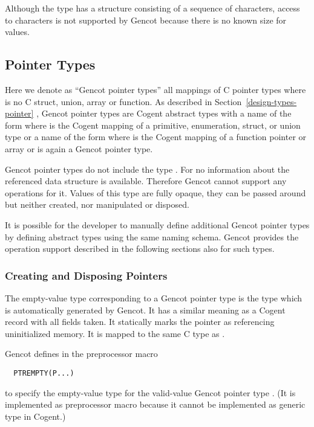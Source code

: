 Although the type  has a structure consisting of a sequence of characters, access to characters is not supported
by Gencot because there is no known size for  values.

\subsection{Pointer Types}
\label{design-operations-pointer}

Here we denote as ``Gencot pointer types'' all mappings of C pointer types  where  is no C struct, union, array or function.
As described in Section~\ref{design-types-pointer} , Gencot pointer types are 
Cogent abstract types with a name of the form  where  is the Cogent mapping of a primitive, enumeration, struct, or union 
type  or a name of the form  where  is the Cogent mapping of a function pointer or array or  is again a 
Gencot pointer type.

Gencot pointer types do not include the type . For  no information about the referenced data structure is available. 
Therefore Gencot cannot support any operations 
for it. Values of this type are fully opaque, they can be passed around but neither created, nor manipulated or disposed. 

It is possible for the developer to manually define additional Gencot pointer types by defining abstract types using the same naming schema.
Gencot provides the operation support described in the following sections also for such types.

\subsubsection{Creating and Disposing Pointers}

The empty-value type corresponding to a Gencot pointer type  is the type  which
is automatically generated by Gencot. It has a similar meaning as a Cogent
record with all fields taken. It statically marks the pointer as referencing uninitialized memory. It is mapped to the same C 
type as .

Gencot defines in  the preprocessor macro 
\begin{verbatim}
  PTREMPTY(P...)
\end{verbatim}
to specify the empty-value type for the valid-value Gencot pointer type . (It is implemented 
as preprocessor macro because it cannot be implemented as generic type in Cogent.)

